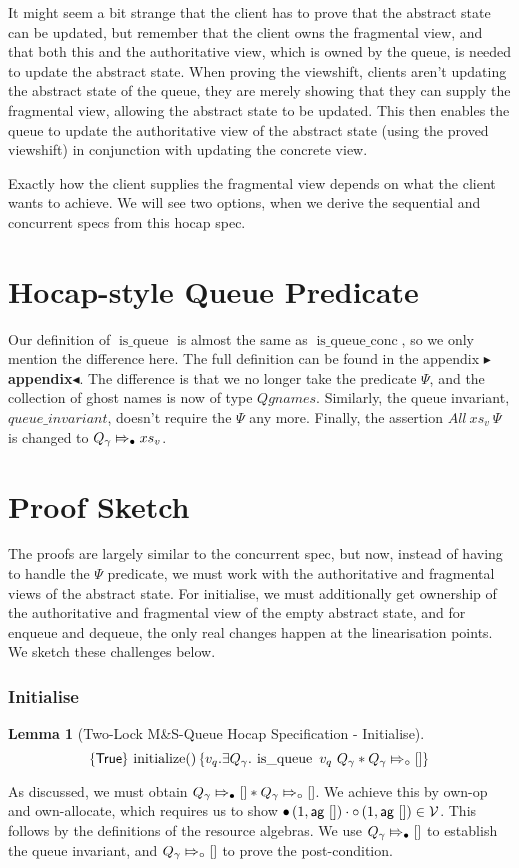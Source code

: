 \documentclass[a4paper, 11pt]{report}
\newtheorem{lemma}[theorem]{Lemma}
\newcommand{\initialise}{\operatorname{initialize}}
\newcommand{\tlmsq}{Two-Lock M\&S-Queue\xspace}
\newcommand{\isqueue}{\operatorname{is\_queue}}
\newcommand{\isqueueconc}{\operatorname{is\_queue\_conc}}
\newcommand{\Qgnames}{Qgnames}
\newcommand{\Qg}{Q_\gname}
\newcommand{\Vl}{\ensuremath{\mathcal{V}}}
\newcommand{\abstractstatefullfrag}[2]{#1 \Mapsto_{\circ} #2}
\newcommand{\abstractstateauth}[2]{#1 \Mapsto_{\bullet} #2}
\newcommand{\tlhocapspecinit}{\hoare{\TRUE}{\initialise \TT}{v_q . \Exists Q_\gname . \isqueue\ v_q \ Q_\gname \star \abstractstatefullfrag{\Qg}{[]}}}
\newcommand{\todo}[1]{{\color[rgb]{.5,0,0}\textbf{$\blacktriangleright$#1$\blacktriangleleft$}}}
\begin{document}
It might seem a bit strange that the client has to prove that the abstract state can be updated, but remember that the client owns the fragmental view, and that both this and the authoritative view, which is owned by the queue, is needed to update the abstract state. When proving the viewshift, clients aren't updating the abstract state of the queue, they are merely showing that they can supply the fragmental view, allowing the abstract state to be updated. This then enables the queue to update the authoritative view of the abstract state (using the proved viewshift) in conjunction with updating the concrete view.

Exactly how the client supplies the fragmental view depends on what the client wants to achieve. We will see two options, when we derive the sequential and concurrent specs from this hocap spec.

\section{Hocap-style Queue Predicate}
\label{TLMSQHOCAP:section:hocap-queue-pred}
Our definition of $\isqueue$ is almost the same as $\isqueueconc$, so we only mention the difference here. The full definition can be found in the appendix \todo{appendix}. The difference is that we no longer take the predicate $\Psi$, and the collection of ghost names is now of type $\Qgnames$. Similarly, the queue invariant, $queue\_invariant$, doesn't require the $\Psi$ any more. Finally, the assertion $All \ xs_v \ \Psi$ is changed to $\abstractstateauth{\Qg}{xs_v}$.

\section{Proof Sketch}
\label{TLMSQHOCAP:proof-Sketch}
The proofs are largely similar to the concurrent spec, but now, instead of having to handle the $\Psi$ predicate, we must work with the authoritative and fragmental views of the abstract state. For initialise, we must additionally get ownership of the authoritative and fragmental view of the empty abstract state, and for enqueue and dequeue, the only real changes happen at the linearisation points. We sketch these challenges below.

\subsubsection{Initialise}
\begin{lemma}[\tlmsq Hocap Specification - Initialise]\label{TLMSQ:spec:hocap:initialise}
  \begin{equation*}
    \tlhocapspecinit
  \end{equation*}
\end{lemma}
As discussed, we must obtain $\abstractstateauth{\Qg}{[]} \star \abstractstatefullfrag{\Qg}{[]}$. We achieve this by own-op and own-allocate, which requires us to show $\authfull (1, \aginj\ []) \mtimes \authfrag (1, \aginj\ []) \in \Vl$. This follows by the definitions of the resource algebras. We use $\abstractstateauth{\Qg}{[]}$ to establish the queue invariant, and $\abstractstatefullfrag{\Qg}{[]}$ to prove the post-condition.\\
\end{document}
